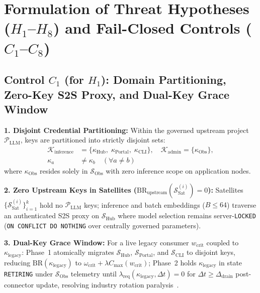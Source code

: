 \documentclass[10pt,twocolumn]{article}
\begin{document}
\section{Formulation of Threat Hypotheses ($H_1$--$H_8$) and Fail-Closed Controls ($C_1$--$C_8$)}

\subsection{Control $C_1$ (for $H_1$): Domain Partitioning, Zero-Key S2S Proxy, and Dual-Key Grace Window}

\textbf{1. Disjoint Credential Partitioning:} Within the governed upstream project $\mathcal{P}_{\mathrm{LLM}}$, keys are partitioned into strictly disjoint sets:
\begin{equation}
\begin{aligned}
\mathcal{K}_{\mathrm{inference}} &= \{\kappa_{\mathrm{Hub}}, \; \kappa_{\mathrm{Portal}}, \; \kappa_{\mathrm{CLI}}\}, \quad
\mathcal{K}_{\mathrm{admin}} = \{\kappa_{\mathrm{Obs}}\},\\
\kappa_a &\neq \kappa_b \quad (\forall a \neq b)
\end{aligned}
\end{equation}
where $\kappa_{\mathrm{Obs}}$ resides solely in $\mathcal{S}_{\mathrm{Obs}}$ with zero inference scope on application nodes.

\textbf{2. Zero Upstream Keys in Satellites ($\mathrm{BR}_{\mathrm{upstream}}(\mathcal{S}_{\mathrm{Sat}}^{(i)}) = 0$):} Satellites $\{\mathcal{S}_{\mathrm{Sat}}^{(i)}\}_{i=1}^{k}$ hold no $\mathcal{P}_{\mathrm{LLM}}$ keys; inference and batch embeddings ($B \le 64$) traverse an authenticated S2S proxy on $\mathcal{S}_{\mathrm{Hub}}$ where model selection remains server-\texttt{LOCKED} (\texttt{ON CONFLICT DO NOTHING} over centrally governed parameters).

\textbf{3. Dual-Key Grace Window:} For a live legacy consumer $w_{\mathrm{crit}}$ coupled to $\kappa_{\mathrm{legacy}}$: Phase~1 atomically migrates $\mathcal{S}_{\mathrm{Hub}}$, $\mathcal{S}_{\mathrm{Portal}}$, and $\mathcal{S}_{\mathrm{CLI}}$ to disjoint keys, reducing $\mathrm{BR}(\kappa_{\mathrm{legacy}})$ to $\omega_{\mathrm{crit}} + \lambda C_{\max}(w_{\mathrm{crit}})$; Phase~2 holds $\kappa_{\mathrm{legacy}}$ in state \texttt{RETIRING} under $\mathcal{S}_{\mathrm{Obs}}$ telemetry until $\lambda_{\mathrm{req}}(\kappa_{\mathrm{legacy}}, \Delta t) = 0$ for $\Delta t \ge \Delta_{\mathrm{drain}}$ post-connector update, resolving industry rotation paralysis~\cite{R01,R16,R20}.
\end{document}
